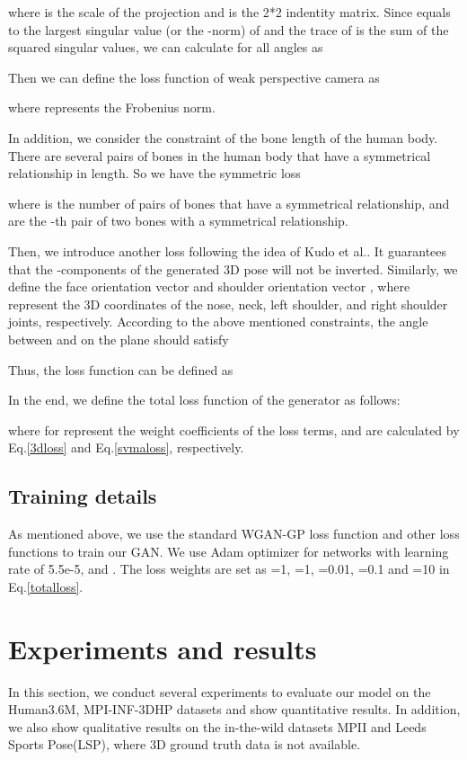 \documentclass[10pt,twocolumn,letterpaper]{article}
\begin{document}
where  is the scale of the projection and  is the 2*2 indentity matrix. Since  equals to the largest singular value (or the -norm) of  and the trace of  is the sum of the squared singular values, we can calculate  for all angles as

Then we can define the loss function of weak perspective camera as

where represents the Frobenius norm.




In addition, we consider the constraint of the bone length of the human body. There are several pairs of bones in the human body that have a symmetrical relationship in length. So we have the symmetric loss

where  is the number of pairs of bones that have a symmetrical relationship,  and  are the -th pair of two bones with a symmetrical relationship.

Then, we introduce another loss  following the idea of Kudo et al.\cite{2018Unsupervised}. It guarantees that the -components of the generated 3D pose will not be inverted. Similarly, we define the face orientation vector
 and shoulder orientation vector , where  represent the 3D coordinates of the nose, neck, left shoulder, and right shoulder joints, respectively. According to the above mentioned constraints, the angle  between  and  on the  plane should satisfy

Thus, the loss function can be defined as


In the end, we define the total loss function of the generator as follows:

where  for 
represent the weight coefficients of the loss terms,  and  are calculated by Eq.\ref{3dloss} and Eq.\ref{svmaloss}, respectively.


\subsection{Training details}
As mentioned above, we use the standard WGAN-GP loss function and other loss functions to train our GAN. We use Adam optimizer\cite{2014Adam} for networks with learning rate of 5.5e-5,  and . The loss weights are set as =1, =1, =0.01, =0.1 and =10 in Eq.\ref{totalloss}.



\section{Experiments and results}
In this section, we conduct several experiments to evaluate our model on the Human3.6M\cite{2014Human3}, MPI-INF-3DHP\cite{2017Monocular} datasets and show quantitative results. In addition, we also show qualitative results on the in-the-wild datasets MPII\cite{2014Human} and Leeds Sports Pose(LSP)\cite{2010Clustered}, where 3D ground truth data is not available.
\end{document}
